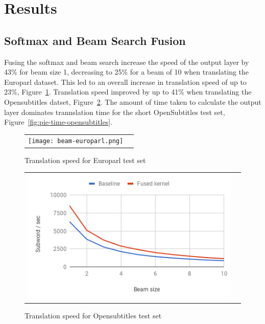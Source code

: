 \documentclass[11pt,a4paper]{article}
\begin{document}
\section{Results}
\label{sec:Results}

\subsection{Softmax and Beam Search Fusion}

Fusing the softmax and beam search increase the speed of the output layer by 43\% for beam size 1, decreasing to 25\% for a beam of 10 when translating the Europarl dataset. This led to an overall increase in translation speed of up to 23\%, Figure~\ref{fig:beam-europarl}. Translation speed improved by up to 41\% when translating the Opensubtitles datset, Figure~\ref{fig:beam-opensubtitles}. The amount of time taken to calculate the output layer dominates trannslation time for the short OpenSubtitles test set, Figure~\ref{fig:pie-time-opensubtitles}.

\begin{figure}
\centering
\begin{tabular}{cc}
{\texttt{[image: beam-europarl.png]}} 
\end{tabular}
\caption{Translation speed for Europarl test set}
\label{fig:beam-europarl}
\end{figure} 

\begin{figure}
\centering
\begin{tabular}{cc}
{\includegraphics[scale=0.5]{beam-opensubtitles.png}} 
\end{tabular}
\caption{Translation speed for Opensubtitles test set}
\label{fig:beam-opensubtitles}
\end{figure} 
\end{document}
